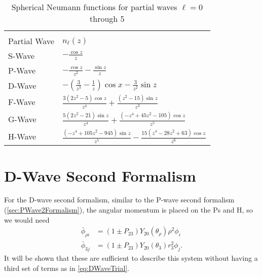 \documentclass[Dissertation.tex]{subfiles}
\begin{document}
{
\renewcommand{\arraystretch}{1.5}
\begin{table}
\centering
\begin{tabular}{l l}
\toprule\\[-1.2cm]
Partial Wave & $n_\ell(z)$ \\
\midrule
S-Wave & $-\frac{\cos z}{z}$ \\
P-Wave & $-\frac{\cos z}{z^2} - \frac{\sin z}{z}$ \\
D-Wave & $-\left(\frac{3}{z^3}-\frac{1}{z}\right)\cos x - \frac{3}{z^2}\sin z$ \\
F-Wave & $\frac{3 \left(2 z^2-5\right) \cos z}{z^4}+\frac{\left(z^2-15\right) \sin z}{z^3}$ \\
G-Wave & $\frac{5 \left(2 z^2-21\right) \sin z}{z^4}+\frac{\left(-z^4+45 z^2-105\right) \cos z}{z^5}$ \\
H-Wave & $\frac{\left(-z^4+105 z^2-945\right) \sin z}{z^5}-\frac{15 \left(z^4-28 z^2+63\right) \cos z}{z^6}$ \\
\bottomrule
\end{tabular}
\caption{Spherical Neumann functions for partial waves $\ell = 0$ through 5}
\label{tab:SphNeum}
\end{table}
}


\section{D-Wave Second Formalism}
\label{sec:DSecondForm}
For the D-wave second formalism, similar to the P-wave second formalism
(\cref{sec:PWave2Formalism}), the angular momentum is placed on the Ps and
H, so we would need
\begin{subequations}
\label{eq:DWave2ndPhiBar}
\begin{align}
\bar{\phi}_{\rho i} &= \left(1 \pm P_{23}\right) Y_{20}(\theta_\rho) \rho^2 \phi_i \label{eq:DWave2ndPhi1i}\\
\bar{\phi}_{3j} &= \left(1 \pm P_{23}\right) Y_{20}(\theta_3) r_3^2 \phi_j \label{eq:DWave2ndPhi2j}.
\end{align}
\end{subequations}
It will be shown that these are sufficient to describe this system without 
having a third set of terms as in \cref{eq:DWaveTrial}.
\end{document}

